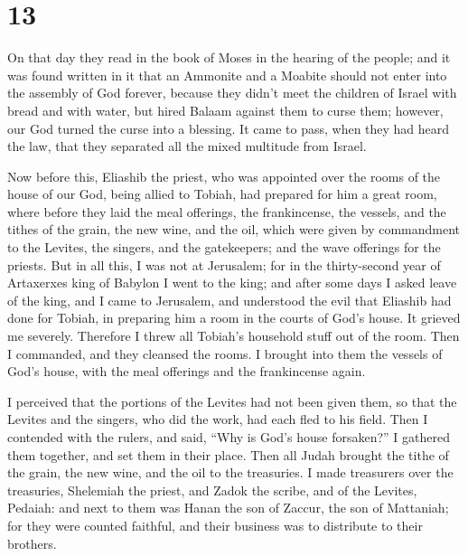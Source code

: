 \hypertarget{section-12}{%
\section{13}\label{section-12}}

 On that day they read in the book of Moses in the hearing
of the people; and it was found written in it that an Ammonite and a
Moabite should not enter into the assembly of God forever,
 because they didn't meet the children of Israel with
bread and with water, but hired Balaam against them to curse them;
however, our God turned the curse into a blessing.  It
came to pass, when they had heard the law, that they separated all the
mixed multitude from Israel.

 Now before this, Eliashib the priest, who was appointed
over the rooms of the house of our God, being allied to Tobiah,
 had prepared for him a great room, where before they laid
the meal offerings, the frankincense, the vessels, and the tithes of the
grain, the new wine, and the oil, which were given by commandment to the
Levites, the singers, and the gatekeepers; and the wave offerings for
the priests.  But in all this, I was not at Jerusalem; for
in the thirty-second year of Artaxerxes king of Babylon I went to the
king; and after some days I asked leave of the king,  and
I came to Jerusalem, and understood the evil that Eliashib had done for
Tobiah, in preparing him a room in the courts of God's house.
 It grieved me severely. Therefore I threw all Tobiah's
household stuff out of the room.  Then I commanded, and
they cleansed the rooms. I brought into them the vessels of God's house,
with the meal offerings and the frankincense again.

 I perceived that the portions of the Levites had not
been given them, so that the Levites and the singers, who did the work,
had each fled to his field.  Then I contended with the
rulers, and said, ``Why is God's house forsaken?'' I gathered them
together, and set them in their place.  Then all Judah
brought the tithe of the grain, the new wine, and the oil to the
treasuries.  I made treasurers over the treasuries,
Shelemiah the priest, and Zadok the scribe, and of the Levites, Pedaiah:
and next to them was Hanan the son of Zaccur, the son of Mattaniah; for
they were counted faithful, and their business was to distribute to
their brothers.


